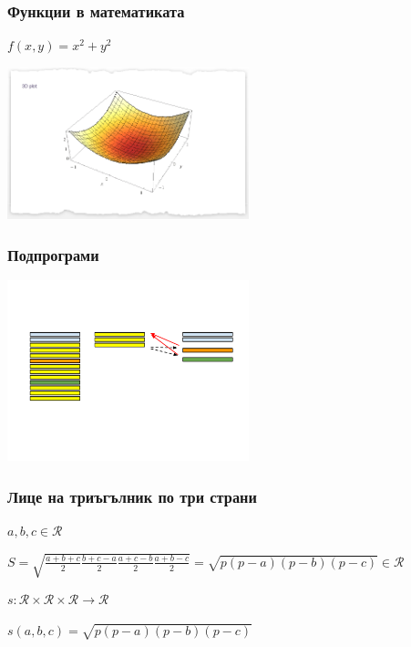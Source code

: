 \documentclass{beamer}
\begin{document}
\begin{frame}[fragile]
\frametitle{Функции в математиката}

$f(x,y) = x^2+y^2$

\begin{center}
\includegraphics[width=7cm]{images/paraboloid}
\end{center}

\end{frame}




\begin{frame}[fragile]
\frametitle{Подпрограми}

\begin{center}
\includegraphics[width=7cm]{images/subprog}
\end{center}


\end{frame}



\begin{frame}[fragile]
\frametitle{Лице на триъгълник по три страни}

\begin{flushleft}
$a,b,c \in \mathcal{R}$

$S = \sqrt{\frac{a+b+c}{2}\frac{b+c-a}{2}\frac{a+c-b}{2}\frac{a+b-c}{2}}=\sqrt{p(p-a)(p-b)(p-c)} \in \mathcal{R}$
\end{flushleft}

\pause

$s:\mathcal{R}\times\mathcal{R}\times\mathcal{R} \rightarrow \mathcal{R}$

\pause

$s(a,b,c)=\sqrt{p(p-a)(p-b)(p-c)}$


\end{frame}
\end{document}
